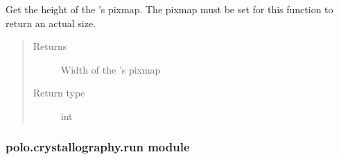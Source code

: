 \documentclass[letterpaper,10pt,english]{sphinxmanual}
\begin{document}
\begin{fulllineitems}
\begin{fulllineitems}
\label{\detokenize{polo.crystallography:polo.crystallography.image.Image.width}}
Get the height of the 
{\hyperref[\detokenize{polo.crystallography:polo.crystallography.image.Image}]{}}’s pixmap. 
The pixmap must be set for this function to return 
an actual size.
\begin{quote}\begin{description}
\item[{Returns}] \leavevmode
Width of the 
{\hyperref[\detokenize{polo.crystallography:polo.crystallography.image.Image}]{}}’s
pixmap

\item[{Return type}] \leavevmode
int

\end{description}\end{quote}

\end{fulllineitems}


\end{fulllineitems}



\subsubsection{polo.crystallography.run module}
\label{\detokenize{polo.crystallography:module-polo.crystallography.run}}\label{\detokenize{polo.crystallography:polo-crystallography-run-module}}
\end{document}
